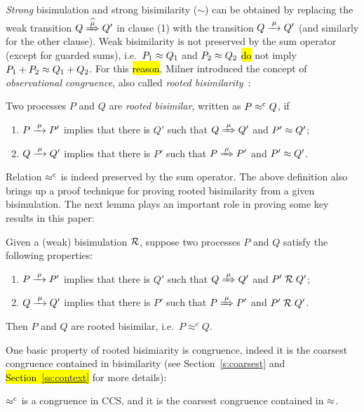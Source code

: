 \emph{Strong} bisimulation and strong bisimilarity ($\sim$)
can be obtained by replacing the weak transition $Q\Arcap\mu Q'$ in 
clause (1) 
 with the transition $Q \arr \mu Q'$ (and similarly for the other clause).
Weak bisimilarity is not preserved by the sum operator (except for
guarded sums), i.e.~$P_1 \approx Q_1$ and $P_2 \approx Q_2$  \hl{do} not imply
 $P_1 + P_2 \approx Q_1 + Q_2$.
For this \hl{reason}, Milner introduced the concept of
\emph{observational congruence}, also called \emph{rooted
  bisimilarity}~\cite{Gorrieri:2015jt,Sangiorgi:2011ut}:
\begin{definition}%
\label{d:rootedBisimilarity}
Two processes $P$ and $Q$ are \emph{rooted bisimilar}, written as $P
\mathrel{\approx^{\rm{c}}} Q$, if %
\begin{enumerate}
 \item  $P \arr\mu P'$ implies that there is $Q'$ such that $Q
   \Arr\mu Q'$ and $P' \approx Q'$;
 \item  $Q \arr\mu Q'$ implies that there is $P'$ such that $P
   \Arr\mu P'$ and $P' \approx Q'$\enspace.
\end{enumerate}
\end{definition}
Relation $\mathrel{\approx^{\rm{c}}}$ is indeed preserved by the sum operator.
The above definition also brings up a proof technique for proving rooted
bisimilarity from a given bisimulation. The next
lemma plays an
important role in proving some key results in this paper:
\begin{lemma}
\label{l:obsCongrByWeakBisim}
Given a (weak) bisimulation $\mathrel{\cal R}$, suppose two processes $P$ and $Q$
satisfy the following properties:
\begin{enumerate}
\item $P \arr\mu P'$ implies that there is $Q'$ such that $Q
   \Arr\mu Q'$ and $P' \mathrel{\cal R} Q'$;
\item $Q \arr\mu Q'$ implies that there is $P'$ such that $P
   \Arr\mu P'$ and $P' \mathrel{\cal R} Q'$.
\end{enumerate}
Then $P$ and $Q$ are rooted bisimilar, i.e.~$P \approx^c Q$.
\end{lemma}

One basic property of rooted bisimiarity is congruence,
indeed it is  the coarsest congruence contained in bisimilarity
(see Section~\ref{s:coarsest} and \hl{\mbox{Section~\ref{ss:context}}} for more details):
\begin{theorem}
\label{t:rapproxCongruence}
$\mathrel{\approx^{\rm{c}}}$ is a congruence in CCS, and it is the
coarsest congruence contained in $\approx$.
\end{theorem}


